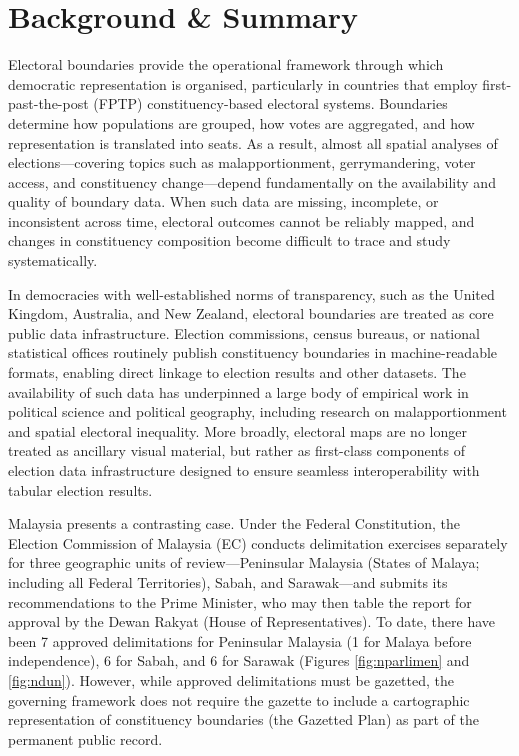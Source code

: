 \documentclass[11pt]{article}
\begin{document}
\newpage
{}

\section*{Background \& Summary}
Electoral boundaries provide the operational framework through which democratic representation is organised, particularly in countries that employ first-past-the-post (FPTP) constituency-based electoral systems. Boundaries determine how populations are grouped, how votes are aggregated, and how representation is translated into seats. As a result, almost all spatial analyses of elections---covering topics such as malapportionment, gerrymandering, voter access, and constituency change---depend fundamentally on the availability and quality of boundary data. When such data are missing, incomplete, or inconsistent across time, electoral outcomes cannot be reliably mapped, and changes in constituency composition become difficult to trace and study systematically.

In democracies with well-established norms of transparency, such as the United Kingdom, Australia, and New Zealand, electoral boundaries are treated as core public data infrastructure. Election commissions, census bureaus, or national statistical offices routinely publish constituency boundaries in machine-readable formats, enabling direct linkage to election results and other datasets. The availability of such data has underpinned a large body of empirical work in political science and political geography, including research on malapportionment and spatial electoral inequality.\cite{openshaw1984modifiable,samuels2001value} More broadly, electoral maps are no longer treated as ancillary visual material, but rather as first-class components of election data infrastructure designed to ensure seamless interoperability with tabular election results.\cite{clea}

Malaysia presents a contrasting case. Under the Federal Constitution, the Election Commission of Malaysia (EC) conducts delimitation exercises separately for three geographic units of review---Peninsular Malaysia (States of Malaya; including all Federal Territories), Sabah, and Sarawak---and submits its recommendations to the Prime Minister, who may then table the report for approval by the Dewan Rakyat (House of Representatives). To date, there have been 7 approved delimitations for Peninsular Malaysia (1 for Malaya before independence), 6 for Sabah, and 6 for Sarawak (Figures \ref{fig:nparlimen} and \ref{fig:ndun}). However, while approved delimitations must be gazetted, the governing framework does not require the gazette to include a cartographic representation of constituency boundaries (the Gazetted Plan) as part of the permanent public record.
\end{document}
